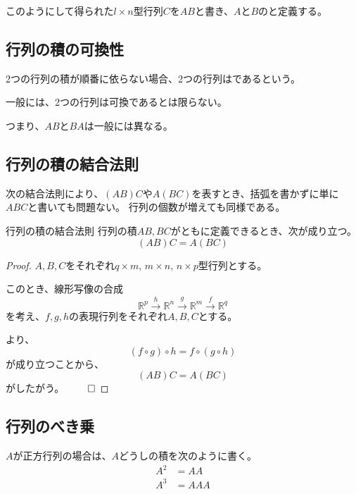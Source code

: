 \documentclass[../../../topic_linear-algebra]{subfiles}
\begin{document}
\br

このようにして得られた$l \times n$型行列$C$を$AB$と書き、$A$と$B$のと定義する。

\subsection{行列の積の可換性}

2つの行列の積が順番に依らない場合、2つの行列はであるという。

\br

一般には、2つの行列は可換であるとは限らない。

つまり、$AB$と$BA$は一般には異なる。

\begin{mindflow}
\end{mindflow}

\subsection{行列の積の結合法則}

次の結合法則により、$(AB)C$や$A(BC)$を表すとき、括弧を書かずに単に$ABC$と書いても問題ない。
行列の個数が増えても同様である。

\begin{theorem*}{行列の積の結合法則}
  行列の積$AB, BC$がともに定義できるとき、次が成り立つ。
  \begin{equation*}
    (AB)C = A(BC)
  \end{equation*}
\end{theorem*}

\begin{proof}
  $A,B, C$をそれぞれ$q \times m, \, m \times n, \, n \times p$型行列とする。

  このとき、線形写像の合成
  \begin{equation*}
    \mathbb{R}^p \xrightarrow{h} \mathbb{R}^n \xrightarrow{g} \mathbb{R}^m \xrightarrow{f} \mathbb{R}^q
  \end{equation*}
  を考え、$f,g,h$の表現行列をそれぞれ$A,B,C$とする。
  
  \br

  より、
  \begin{equation*}
    (f \circ g) \circ h = f \circ (g \circ h)
  \end{equation*}
  が成り立つことから、
  \begin{equation*}
    (AB)C = A(BC)
  \end{equation*}
  がしたがう。 $\qed$
\end{proof}

\subsection{行列のべき乗}

$A$が正方行列の場合は、$A$どうしの積を次のように書く。
\begin{align*}
  A^2 & = AA  \\
  A^3 & = AAA
\end{align*}
\end{document}
